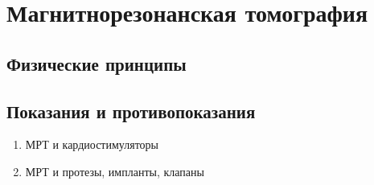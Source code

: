 \section{Магнитнорезонанская томография}
\subsection{Физические принципы}
\subsection{Показания и противопоказания}
\begin{enumerate}
\item МРТ и кардиостимуляторы
\item МРТ и протезы, импланты, клапаны
\end{enumerate}